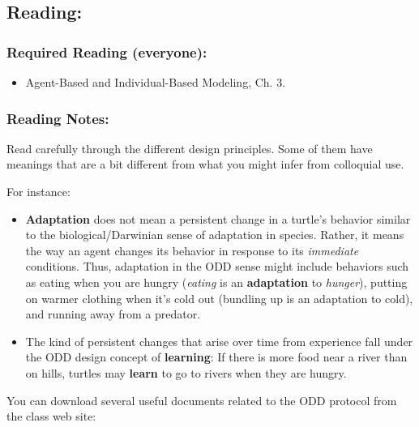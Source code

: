 \documentclass[
]{article}
\providecommand{\tightlist}{%
  \setlength{\itemsep}{0pt}\setlength{\parskip}{0pt}}
\begin{document}
\subsection{Reading:}\label{reading-3}

\subsubsection{Required Reading
(everyone):}\label{required-reading-everyone-2}

\begin{itemize}
\tightlist
\item
  Agent-Based and Individual-Based Modeling, Ch. 3.
\end{itemize}

\subsubsection{Reading Notes:}\label{reading-notes-2}

Read carefully through the different design principles. Some of them
have meanings that are a bit different from what you might infer from
colloquial use.

For instance:

\begin{itemize}
\tightlist
\item
  \textbf{Adaptation} does not mean a persistent change in a turtle's
  behavior similar to the biological/Darwinian sense of adaptation in
  species. Rather, it means the way an agent changes its behavior in
  response to its \emph{immediate} conditions. Thus, adaptation in the
  ODD sense might include behaviors such as eating when you are hungry
  (\emph{eating} is an \textbf{adaptation} to \emph{hunger}), putting on
  warmer clothing when it's cold out (bundling up is an adaptation to
  cold), and running away from a predator.
\item
  The kind of persistent changes that arise over time from experience
  fall under the ODD design concept of \textbf{learning}: If there is
  more food near a river than on hills, turtles may \textbf{learn} to go
  to rivers when they are hungry.
\end{itemize}

You can download several useful documents related to the ODD protocol
from the class web site:
\end{document}
